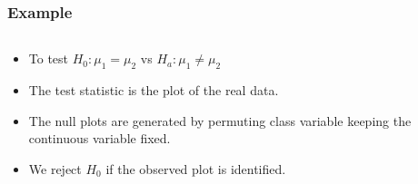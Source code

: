 \documentclass{beamer}
\begin{document}
\begin{frame}
  \frametitle{Example}
  
	\begin{columns}
	
		\begin{column}{0.4\textwidth}
		  \begin{itemize}
			  \item To test $H_0: \mu_1 = \mu_2$ vs $H_a: \mu_1 \ne \mu_2$
			  \item The test statistic is the plot of the real data.
			  \item The null plots are generated by permuting class variable keeping the continuous variable fixed.			
			    \item We reject $H_0$ if the observed plot is identified.		
		 \end{itemize}		
		\end{column}
		
		\begin{column}{0.6\textwidth}
			 \begin{center}  \end{center}
		\end{column}
		
	\end{columns} 
	
\end{frame}
\end{document}
